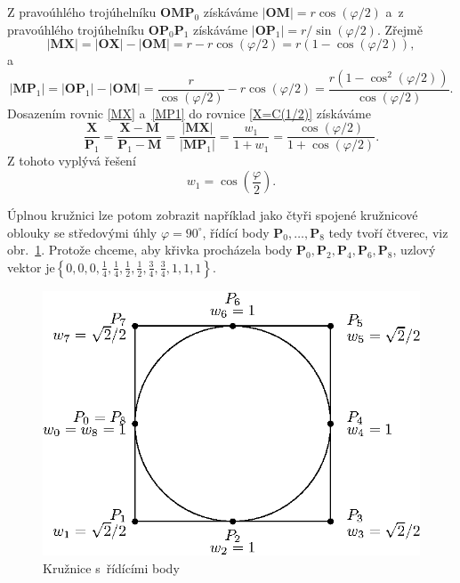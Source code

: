 Z pravoúhlého trojúhelníku $\mathbf{OMP}_0$ získáváme $\left|\mathbf{OM}\right|=r\cos\left(\varphi/2\right)$ a~z pravoúhlého trojúhelníku $\mathbf{OP}_0\mathbf{P}_1$ získáváme $\left|\mathbf{OP}_1\right|=r/\sin\left(\varphi/2\right)$. Zřejmě
\begin{equation}\label{MX}
	\left| \mathbf{MX}\right|=\left| \mathbf{OX}\right| -\left| \mathbf{OM}\right|=r-r\cos\left(\varphi/2\right)=r\left(1-\cos\left(\varphi/2\right)\right),
\end{equation}
a
\begin{equation}\label{MP1}
	\left| \mathbf{MP}_1\right|=\left| \mathbf{OP}_1\right| -\left| \mathbf{OM}\right| =\frac{r}{\cos\left(\varphi/2\right)}-r\cos\left(\varphi/2\right)=\frac{r\left(1-\cos^2\left(\varphi/2\right)\right)}{\cos\left(\varphi/2\right)}.
\end{equation}
Dosazením rovnic \eqref{MX} a~\eqref{MP1} do rovnice \eqref{X=C(1/2)} získáváme
\begin{equation}
	\frac{\mathbf{X}}{\mathbf{P}_1}=\frac{\mathbf{X}-\mathbf{M}}{\mathbf{P}_1-\mathbf{M}}=\frac{\left|\mathbf{MX}\right|}{\left|\mathbf{MP}_1\right|}=\frac{w_1}{1+w_1}=\frac{\cos\left(\varphi/2\right)}{1+\cos\left(\varphi/2\right)}.
\end{equation}
Z tohoto vyplývá řešení
\begin{equation}\label{w=cos(fi/2)}
	w_1=\cos\left(\frac{\varphi}{2}\right).
\end{equation}

Úplnou kružnici lze potom zobrazit například jako čtyři spojené kružnicové oblouky se středovými úhly $\varphi=90^{\circ}$, řídící body $\mathbf{P}_0,\dots,\mathbf{P}_8$ tedy tvoří čtverec, viz obr.~\ref{kruznice}. Protože chceme, aby křivka procházela body $\mathbf{P}_0,\mathbf{P}_2,\mathbf{P}_4,\mathbf{P}_6,\mathbf{P}_8$, uzlový vektor je\linebreak$\left\lbrace 0,0,0,\frac{1}{4},\frac{1}{4},\frac{1}{2},\frac{1}{2},\frac{3}{4},\frac{3}{4},1,1,1 \right\rbrace $.
\begin{figure}[!h]
	\begin{center}
		\includegraphics*[]{obr/kruh}
	\end{center}
	\caption{Kružnice s~řídícími body}
	\label{kruznice}
\end{figure}

